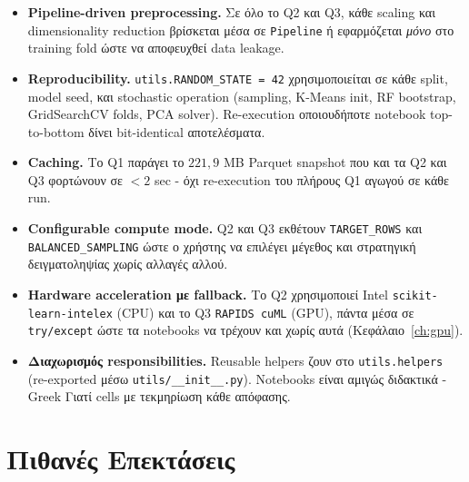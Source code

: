 \documentclass[12pt,a4paper,twoside]{book}
\begin{document}
\begin{itemize}
    \item \textbf{Pipeline-driven preprocessing.} Σε όλο το Q2 και Q3,
    κάθε scaling και dimensionality reduction βρίσκεται μέσα σε
    \texttt{Pipeline} ή εφαρμόζεται \emph{μόνο} στο training fold ώστε
    να αποφευχθεί data leakage.
    \item \textbf{Reproducibility.} \texttt{utils.RANDOM\_STATE = 42}
    χρησιμοποιείται σε κάθε split, model seed, και stochastic operation
    (sampling, K-Means init, RF bootstrap, GridSearchCV folds, PCA solver).
    Re-execution οποιουδήποτε notebook top-to-bottom δίνει bit-identical
    αποτελέσματα.
    \item \textbf{Caching.} Το Q1 παράγει το \(221{,}9\) MB Parquet
    snapshot που και τα Q2 και Q3 φορτώνουν σε \(<2\) sec - όχι
    re-execution του πλήρους Q1 αγωγού σε κάθε run.
    \item \textbf{Configurable compute mode.} Q2 και Q3 εκθέτουν
    \texttt{TARGET\_ROWS} και \texttt{BALANCED\_SAMPLING} ώστε ο χρήστης
    να επιλέγει μέγεθος και στρατηγική δειγματοληψίας χωρίς αλλαγές αλλού.
    \item \textbf{Hardware acceleration με fallback.} Το Q2 χρησιμοποιεί
    Intel \texttt{scikit-learn-intelex} (CPU) και το Q3 \texttt{RAPIDS
    cuML} (GPU), πάντα μέσα σε \texttt{try/except} ώστε τα notebooks να
    τρέχουν και χωρίς αυτά (Κεφάλαιο~\ref{ch:gpu}).
    \item \textbf{Διαχωρισμός responsibilities.} Reusable helpers ζουν
    στο \texttt{utils.helpers} (re-exported μέσω
    \texttt{utils/\_\_init\_\_.py}). Notebooks είναι αμιγώς διδακτικά -
    Greek \og Γιατί\fg{} cells με τεκμηρίωση κάθε απόφασης.
\end{itemize}

\section{Πιθανές Επεκτάσεις}
\end{document}
